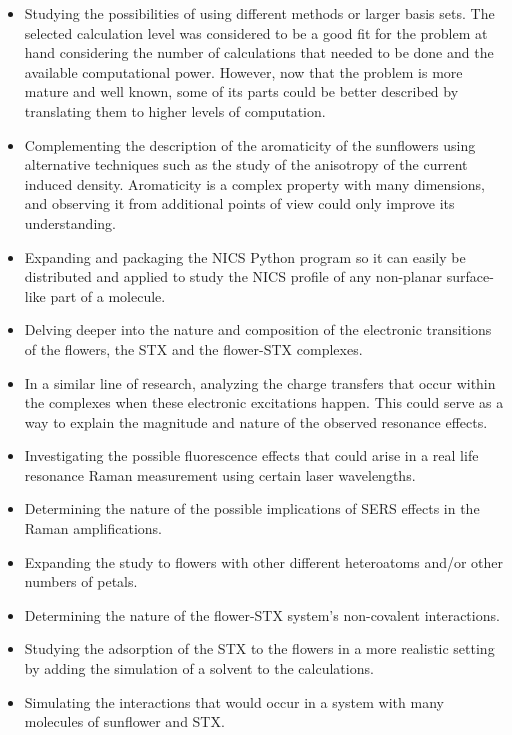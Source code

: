 \begin{itemize}
    \item Studying the possibilities of using different methods or larger basis sets. The selected calculation level was considered to be a good fit for the problem at hand considering the number of calculations that needed to be done and the available computational power. However, now that the problem is more mature and well known, some of its parts could be better described by translating them to higher levels of computation.
    \item Complementing the description of the aromaticity of the sunflowers using alternative techniques such as the study of the anisotropy of the current induced density. Aromaticity is a complex property with many dimensions, and observing it from additional points of view could only improve its understanding.
    \item Expanding and packaging the NICS Python program so it can easily be distributed and applied to study the NICS profile of any non-planar surface-like part of a molecule.
    \item Delving deeper into the nature and composition of the electronic transitions of the flowers, the STX and the flower-STX complexes.
    \item In a similar line of research, analyzing the charge transfers that occur within the complexes when these electronic excitations happen. This could serve as a way to explain the magnitude and nature of the observed resonance effects.
    \item Investigating the possible fluorescence effects that could arise in a real life resonance Raman measurement using certain laser wavelengths.
    \item Determining the nature of the possible implications of SERS effects in the Raman amplifications.
    \item Expanding the study to flowers with other different heteroatoms and/or other numbers of petals.
    \item Determining the nature of the flower-STX system's non-covalent interactions.
    \item Studying the adsorption of the STX to the flowers in a more realistic setting by adding the simulation of a solvent to the calculations.
    \item Simulating the interactions that would occur in a system with many molecules of sunflower and STX.
\end{itemize}

